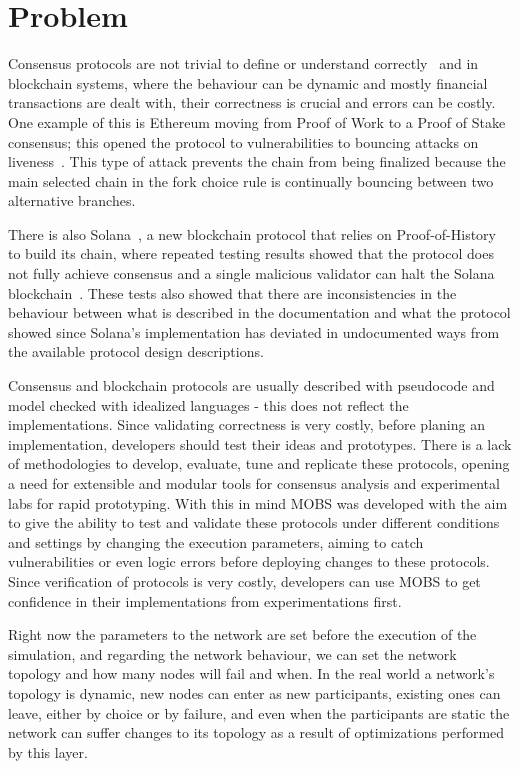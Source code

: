 \section{Problem}\label{sub:problem}
Consensus protocols are not trivial to define or understand correctly~\cite{paxos, have_we_reached_consensus}
and in blockchain systems, where the behaviour can be dynamic and mostly 
financial transactions are dealt with, their correctness is crucial and errors can be costly. One example of this is Ethereum moving from 
Proof of Work to a Proof of Stake consensus; this opened the protocol to vulnerabilities to bouncing attacks on liveness~\cite{ethereum_analysis}.
This type of attack prevents the chain from being finalized because the main selected chain in the fork choice rule
is continually bouncing between two alternative branches.

There is also Solana~\cite{solana}, a new blockchain protocol that relies on Proof-of-History to build its chain,
where repeated testing results showed that the protocol does not fully achieve consensus and
a single malicious validator can halt the Solana blockchain~\cite{solana_halting_problem}. These tests also showed that there are
inconsistencies in the behaviour between what is described in the documentation and what the protocol showed since Solana's implementation
has deviated in undocumented ways from the available protocol design descriptions.

Consensus and blockchain protocols are usually described with pseudocode and model checked with idealized languages - 
this does not reflect the implementations. Since validating correctness is very costly\cite{desidn_and_validation}, before planing an 
implementation, developers should test their ideas and prototypes. There is a lack of methodologies to develop,
evaluate, tune and replicate these protocols, opening a need for extensible and modular tools for consensus analysis and
experimental labs for rapid prototyping.
With this in mind MOBS was developed with the aim to give the ability to test and validate these protocols under different conditions and settings by 
changing the execution parameters, aiming to catch vulnerabilities or even logic errors before deploying changes to these protocols.
Since verification of protocols is very costly, developers can use MOBS to get confidence in their implementations
from experimentations first.

Right now the parameters to the network are set before the execution of the simulation, and regarding the network behaviour, we can
set the network topology and how many nodes will fail and when. In the real world a network's topology is dynamic, new nodes can enter
as new participants, existing ones can leave, either by choice or by failure, and even when the participants are static the network
can suffer changes to its topology as a result of optimizations performed by this layer.

